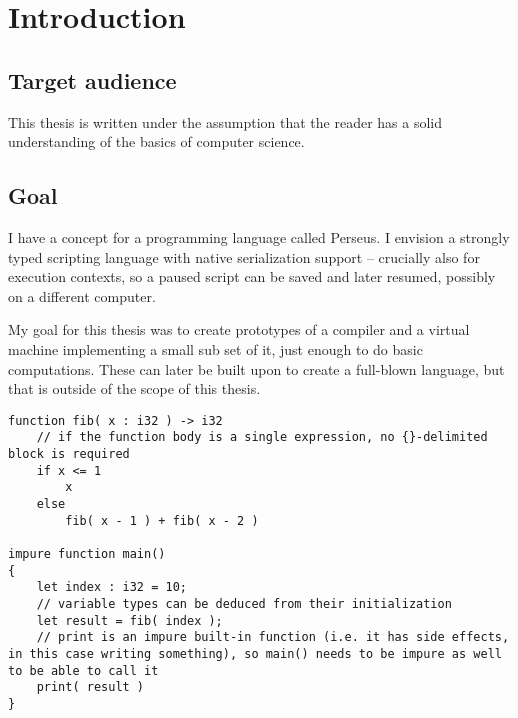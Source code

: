 
\chapter{Introduction} %

    
    \section{Target audience}
    This thesis is written under the assumption that the reader has a solid understanding of the basics of computer science.

	\section{Goal} %
	
	I have a concept for a programming language called Perseus. I envision a strongly typed scripting language with native serialization support -- crucially also for execution contexts, so a paused script can be saved and later resumed, possibly on a different computer.
	
	My goal for this thesis was to create prototypes of a compiler and a virtual machine implementing a small sub set of it, just enough to do basic computations. These can later be built upon to create a full-blown language, but that is outside of the scope of this thesis.
	
	\lstperseus
	\begin{lstlisting}[caption={Desired target language}]
function fib( x : i32 ) -> i32
    // if the function body is a single expression, no {}-delimited block is required
    if x <= 1
        x
    else
        fib( x - 1 ) + fib( x - 2 )

impure function main()
{
	let index : i32 = 10;
	// variable types can be deduced from their initialization
	let result = fib( index );
	// print is an impure built-in function (i.e. it has side effects, in this case writing something), so main() needs to be impure as well to be able to call it
	print( result )
}
	\end{lstlisting}
	
